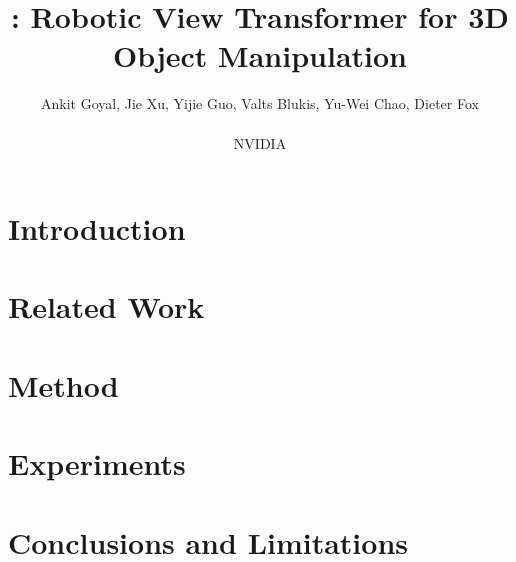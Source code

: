 \documentclass{article}
\title{\method: Robotic View Transformer for 3D Object Manipulation}
\author{Ankit Goyal, Jie Xu, Yijie Guo, Valts Blukis, Yu-Wei Chao, Dieter Fox \\ \\ NVIDIA}
\begin{document}
\maketitle






\section{Introduction}
\label{sec:intro}



\section{Related Work}
\label{sec:related}


\section{Method}


\section{Experiments}
\label{sec:exp}


\section{Conclusions and Limitations}
\label{sec:discussion}


% 


\newpage

\end{document}
